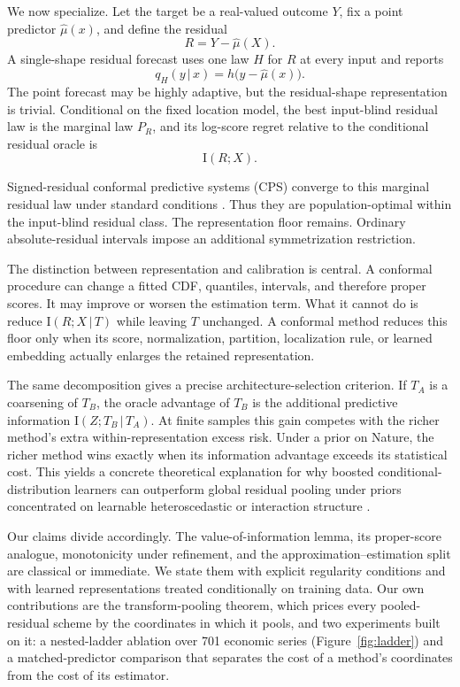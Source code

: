 \documentclass[11pt]{article}
\theoremstyle{remark}
\newcommand{\I}{\mathrm{I}}
\newcommand{\given}{\,|\,}
\begin{document}
We now specialize. Let the target be a real-valued outcome $Y$, fix a point predictor
$\hat\mu(x)$, and define the residual
\[
R=Y-\hat\mu(X).
\]
A single-shape residual forecast uses one law $H$ for $R$ at every input and reports
\[
q_H(y\given x)=h\big(y-\hat\mu(x)\big).
\]
The point forecast may be highly adaptive, but the residual-shape representation is trivial.
Conditional on the fixed location model, the best input-blind residual law is the marginal law
$P_R$, and its log-score regret relative to the conditional residual oracle is
\[
\I(R;X).
\]

Signed-residual conformal predictive systems (CPS) converge to this marginal residual law under
standard conditions \citep{vovk2019nonparametric}. Thus they are population-optimal within
the input-blind residual class. The representation floor remains. Ordinary absolute-residual
intervals impose an additional symmetrization restriction.

The distinction between representation and calibration is central. A conformal procedure can
change a fitted CDF, quantiles, intervals, and therefore proper scores. It may improve or worsen
the estimation term. What it cannot do is reduce $\I(R;X\given T)$ while leaving $T$ unchanged. A
conformal method reduces this floor only when its score, normalization, partition, localization
rule, or learned embedding actually enlarges the retained representation.

The same decomposition gives a precise architecture-selection criterion. If $T_A$ is a coarsening
of $T_B$, the oracle advantage of $T_B$ is the additional predictive information
$\I(Z;T_B\given T_A)$. At finite samples this gain competes with the richer method's extra
within-representation excess risk. Under a prior on Nature, the richer method wins exactly when its information
advantage exceeds its statistical cost. This yields a concrete theoretical explanation for why
boosted conditional-distribution learners can outperform global residual pooling under priors
concentrated on learnable heteroscedastic or interaction structure
\citep{friedman2001greedy,chen2016xgboost,duan2020ngboost}.

Our claims divide accordingly. The value-of-information lemma, its proper-score
analogue, monotonicity under refinement, and the approximation--estimation split are classical
or immediate. We state them with explicit regularity conditions and with learned
representations
treated conditionally on training data. Our own contributions are the transform-pooling
theorem, which prices every pooled-residual scheme by the coordinates in which it pools, and
two experiments built on it: a nested-ladder ablation over 701 economic series
(Figure~\ref{fig:ladder}) and a matched-predictor comparison that separates the cost of a
method's coordinates from the cost of its estimator.
\end{document}
